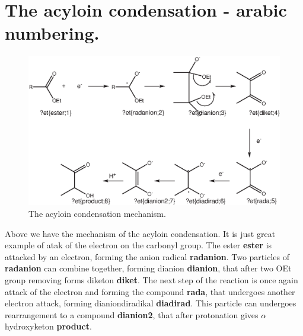 \documentclass[a4paper,12pt,final]{article}
\newcommand{\nrzw}[1]{{\Huge{\textbf{#1}}}}
\begin{document}
\section{The acyloin condensation - arabic numbering.}
\begin{figure}[htp]
\includegraphics[width=1\textwidth]{reaction.eps}
\caption{The acyloin condensation mechanism.}
\end{figure}
Above we have the mechanism of the acyloin condensation. It is just great example of atak of the electron on the carbonyl group. The ester
 \nrzw{ester} is attacked by an electron, forming the anion radical \nrzw{radanion}. Two particles of \nrzw{radanion} can combine together,
  forming dianion \nrzw{dianion}, that after two OEt group removing forms diketon \nrzw{diket}. The next step of the reaction is once again attack of
   the electron and forming the compound \nrzw{rada}, that undergoes another electron attack, forming dianiondiradikal \nrzw{diadirad}. This
    particle can undergoes rearrangement to a compound \nrzw{dianion2}, that after protonation gives $\alpha$ hydroxyketon \nrzw{product}.
    
\newpage
\end{document}
